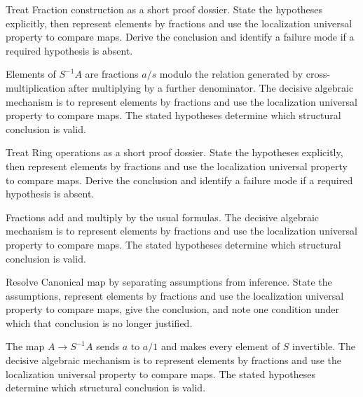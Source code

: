 \begin{problem}\label{prob:v06-problem-01}
Treat Fraction construction as a short proof dossier. State the hypotheses explicitly, then represent elements by fractions and use the localization universal property to compare maps. Derive the conclusion and identify a failure mode if a required hypothesis is absent.
\end{problem}
\begin{solution}
Elements of $S^{-1}A$ are fractions $a/s$ modulo the relation generated by cross-multiplication after multiplying by a further denominator. The decisive algebraic mechanism is to represent elements by fractions and use the localization universal property to compare maps. The stated hypotheses determine which structural conclusion is valid.
\end{solution}

\begin{problem}\label{prob:v06-problem-02}
Treat Ring operations as a short proof dossier. State the hypotheses explicitly, then represent elements by fractions and use the localization universal property to compare maps. Derive the conclusion and identify a failure mode if a required hypothesis is absent.
\end{problem}
\begin{solution}
Fractions add and multiply by the usual formulas. The decisive algebraic mechanism is to represent elements by fractions and use the localization universal property to compare maps. The stated hypotheses determine which structural conclusion is valid.
\end{solution}

\begin{problem}\label{prob:v06-problem-03}
Resolve Canonical map by separating assumptions from inference. State the assumptions, represent elements by fractions and use the localization universal property to compare maps, give the conclusion, and note one condition under which that conclusion is no longer justified.
\end{problem}
\begin{solution}
The map $A\to S^{-1}A$ sends $a$ to $a/1$ and makes every element of $S$ invertible. The decisive algebraic mechanism is to represent elements by fractions and use the localization universal property to compare maps. The stated hypotheses determine which structural conclusion is valid.
\end{solution}

